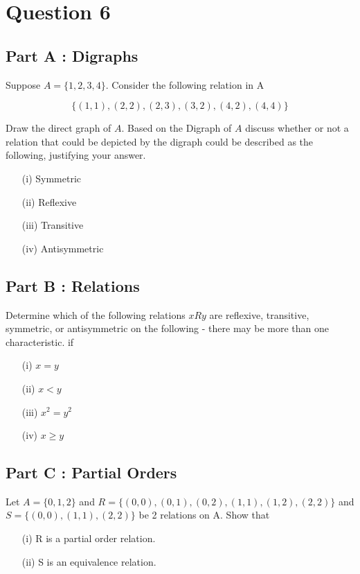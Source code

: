 \documentclass[12pt]{report}
\begin{document}
\section*{Question 6}

\subsection*{Part A : Digraphs}

Suppose $A = $$\{1,2,3,4\}$. Consider the following relation in A

\[ \{  (1,1),(2,2),(2,3),(3,2),(4,2),(4,4)\} \]

Draw the direct graph of $A$. Based on the Digraph of $A$ discuss whether or not a relation that could be depicted by the digraph could be described as the following, justifying your answer.


\begin{itemize}
\item[(i)] Symmetric
\item[(ii)] Reflexive 
\item[(iii)] Transitive
\item[(iv)] Antisymmetric
\end{itemize}
\subsection*{Part B : Relations}
Determine which of the following relations $ x R y$ are reflexive, transitive, symmetric, or antisymmetric on the following - there may be more than one characteristic.  if

\begin{itemize} 
\item[(i)] $x = y$
\item[(ii)] $x < y$
\item[(iii)] $x^2 = y^2$
\item[(iv)] $x \geq y$
\end{itemize}
\subsection*{Part C : Partial Orders}

Let $A=\{0,1,2\}$ and $R=\{ (0,0),(0,1),(0,2),(1,1), (1,2), (2,2)\}$
 and $S=\{(0,0),(1,1),(2,2)\}$ be 2 relations on A. Show that

\begin{itemize}
\item[(i)] R is a partial order relation.
\item[(ii)] S is an equivalence relation.
\end{itemize}
\end{document}
